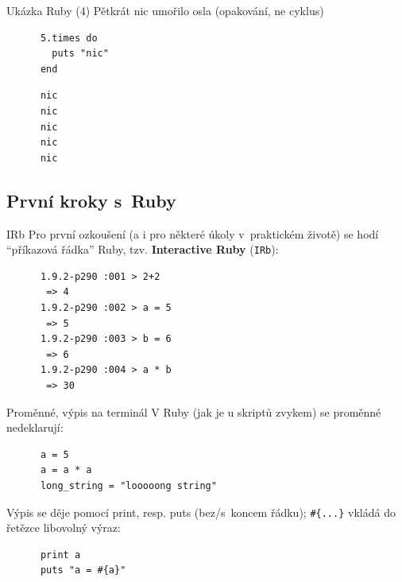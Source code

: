 \documentclass{beamer}
\begin{document}
\begin{frame}[fragile]{Ukázka Ruby (4)}
  Pětkrát nic umořilo osla (opakování, ne cyklus)
  \begin{block}{}
    \smallskip \footnotesize
    {\scriptsize \begin{verbatim}
      5.times do
        puts "nic"
      end
    \end{verbatim}}
  \end{block}
  \pause
  \begin{block}{}
    \smallskip \footnotesize
    {\scriptsize \begin{verbatim}
      nic
      nic
      nic
      nic
      nic
    \end{verbatim}}
  \end{block}
\end{frame}

\subsection{První kroky s~Ruby}

\begin{frame}[fragile]{IRb}
  Pro první ozkoušení (a i pro některé úkoly v~praktickém životě) se hodí ``příkazová řádka'' Ruby, tzv. \textbf{Interactive Ruby} (\texttt{IRb}):
  \pause
  \begin{block}{}
    {\scriptsize \begin{verbatim}
      1.9.2-p290 :001 > 2+2
       => 4
      1.9.2-p290 :002 > a = 5
       => 5
      1.9.2-p290 :003 > b = 6
       => 6
      1.9.2-p290 :004 > a * b
       => 30
    \end{verbatim}}
  \end{block}

\end{frame}

\begin{frame}[fragile]{Proměnné, výpis na terminál}
  V Ruby (jak je u skriptů zvykem) se proměnné nedeklarují:
  \begin{block}{}
    {\scriptsize \begin{verbatim}
      a = 5
      a = a * a
      long_string = "looooong string"
    \end{verbatim}}
  \end{block}
  \pause
  Výpis se děje pomocí print, resp. puts (bez/s~koncem řádku); \texttt{\#\{...\}} vkládá do řetězce libovolný výraz:
  \begin{block}{}
    {\scriptsize \begin{verbatim}
      print a
      puts "a = #{a}"
    \end{verbatim}}
  \end{block}
\end{frame}
\end{document}
